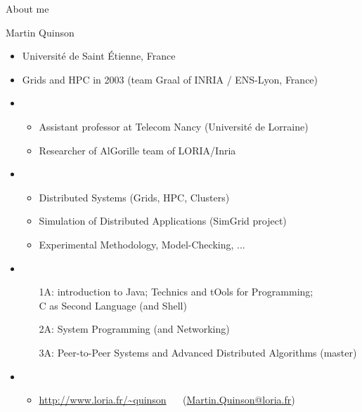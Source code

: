 \begin{frame}{About me}
  \begin{block}{Martin Quinson}
    \begin{itemize}
    \item {} Universit\'e de Saint \'Etienne, France
    \item {} Grids and HPC in 2003 (team Graal of INRIA /
      ENS-Lyon, France)
    \item {}
      \begin{itemize}
      \item Assistant professor at Telecom Nancy (Université de Lorraine)
      \item Researcher of AlGorille team of LORIA/Inria
      \end{itemize}
    \item {}
      \begin{itemize}
      \item {} Distributed Systems (Grids, HPC, Clusters)
      \item {} Simulation of Distributed Applications (SimGrid
        project) 
      \item {} Experimental Methodology, Model-Checking, ...
      \end{itemize}
    \item {}
      \begin{itemize}
      \item[1A:]  introduction to Java;
         Technics and tOols for Programming;\\
         C as Second Language (and Shell)
      \item[2A:]  System Programming (and Networking)
      \item[3A:] Peer-to-Peer Systems and Advanced Distributed Algorithms
        (master)
      \end{itemize}

    \item {}
      \begin{itemize}
      \item \url{http://www.loria.fr/~quinson} ~~
      (\url{Martin.Quinson@loria.fr})
      \end{itemize}
    \end{itemize}
  \end{block}
\end{frame}
